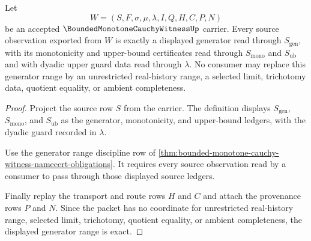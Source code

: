 \begin{theorem}
\label{thm:bounded-monotone-cauchy-witness-generator-range-exactness}
Let
$$
W=(S,F,\sigma,\mu,\lambda,I,Q,H,C,P,N)
$$
be an accepted $\BoundedMonotoneCauchyWitnessUp$ carrier. Every source observation exported from $W$ is exactly a displayed generator read through $S_{\mathrm{gen}}$, with its monotonicity and upper-bound certificates read through $S_{\mathrm{mono}}$ and $S_{\mathrm{ub}}$ and with dyadic upper guard data read through $\lambda$. No consumer may replace this generator range by an unrestricted real-history range, a selected limit, trichotomy data, quotient equality, or ambient completeness.
\end{theorem}
\begin{proof}
Project the source row $S$ from the carrier. The definition displays $S_{\mathrm{gen}}$, $S_{\mathrm{mono}}$, and $S_{\mathrm{ub}}$ as the generator, monotonicity, and upper-bound ledgers, with the dyadic guard recorded in $\lambda$.

Use the generator range discipline row of \autoref{thm:bounded-monotone-cauchy-witness-namecert-obligations}. It requires every source observation read by a consumer to pass through those displayed source ledgers.

Finally replay the transport and route rows $H$ and $C$ and attach the provenance rows $P$ and $N$. Since the packet has no coordinate for unrestricted real-history range, selected limit, trichotomy, quotient equality, or ambient completeness, the displayed generator range is exact.
\end{proof}

